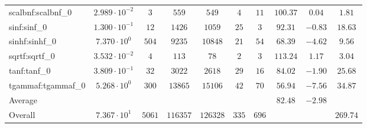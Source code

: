\begin{tabular}{|l|c|c|c|c|c|c|c|c|c|}
scalbnf:scalbnf\_0       & $ 2.989 \cdot 10^{-2} $ & $ 3      $ & $ 559    $ & $ 549    $ & $ 4   $ & $ 11  $ & $ 100.37      $ & $ 0.04    $ & $ 1.81    $ \\
sinf:sinf\_0             & $ 1.300 \cdot 10^{-1} $ & $ 12     $ & $ 1426   $ & $ 1059   $ & $ 25  $ & $ 3   $ & $ 92.31       $ & $ -0.83   $ & $ 18.63   $ \\
sinhf:sinhf\_0           & $ 7.370 \cdot 10^{0}  $ & $ 504    $ & $ 9235   $ & $ 10848  $ & $ 21  $ & $ 54  $ & $ 68.39       $ & $ -4.62   $ & $ 9.56    $ \\
sqrtf:sqrtf\_0           & $ 3.532 \cdot 10^{-2} $ & $ 4      $ & $ 113    $ & $ 78     $ & $ 2   $ & $ 3   $ & $ 113.24      $ & $ 1.17    $ & $ 3.04    $ \\
tanf:tanf\_0             & $ 3.809 \cdot 10^{-1} $ & $ 32     $ & $ 3022   $ & $ 2618   $ & $ 29  $ & $ 16  $ & $ 84.02       $ & $ -1.90   $ & $ 25.68   $ \\
tgammaf:tgammaf\_0       & $ 5.268 \cdot 10^{0}  $ & $ 300    $ & $ 13865  $ & $ 15106  $ & $ 42  $ & $ 70  $ & $ 56.94       $ & $ -7.56   $ & $ 34.87   $ \\
\hline
Average                  & $                     $ & $        $ & $        $ & $        $ & $     $ & $     $ & $ 82.48       $ & $ -2.98   $ & $         $ \\
\hline
Overall                  & $ 7.367 \cdot 10^{1}  $ & $ 5061   $ & $ 116357 $ & $ 126328 $ & $ 335 $ & $ 696 $ & $             $ & $         $ & $ 269.74  $ \\
\hline
\end{tabular}
